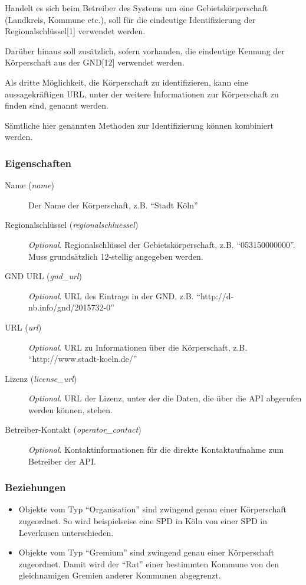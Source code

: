 \documentclass[,a4paper]{article}
\begin{document}
Handelt es sich beim Betreiber des Systems um eine Gebietskörperschaft
(Landkreis, Kommune etc.), soll für die eindeutige Identifizierung der
Regionalschlüssel{[}1{]} verwendet werden.

Darüber hinaus soll zusätzlich, sofern vorhanden, die eindeutige Kennung
der Körperschaft aus der GND{[}12{]} verwendet werden.

Als dritte Möglichkeit, die Körperschaft zu identifizieren, kann eine
aussagekräftigen URL, unter der weitere Informationen zur Körperschaft
zu finden sind, genannt werden.

Sämtliche hier genannten Methoden zur Identifizierung können kombiniert
werden.

\subsubsection{Eigenschaften}

\begin{description}
\item[Name (\emph{name})]
Der Name der Körperschaft, z.B. ``Stadt Köln''
\item[Regionalschlüssel (\emph{regionalschluessel})]
\emph{Optional}. Regionalschlüssel der Gebietskörperschaft, z.B.
``053150000000''. Muss grundsätzlich 12-stellig angegeben werden.
\item[GND URL (\emph{gnd\_url})]
\emph{Optional}. URL des Eintrags in der GND, z.B.
``http://d-nb.info/gnd/2015732-0''
\item[URL (\emph{url})]
\emph{Optional}. URL zu Informationen über die Körperschaft, z.B.
``http://www.stadt-koeln.de/''
\item[Lizenz (\emph{license\_url})]
\emph{Optional}. URL der Lizenz, unter der die Daten, die über die API
abgerufen werden können, stehen.
\item[Betreiber-Kontakt (\emph{operator\_contact})]
\emph{Optional}. Kontaktinformationen für die direkte Kontaktaufnahme
zum Betreiber der API.
\end{description}

\subsubsection{Beziehungen}

\begin{itemize}
\item
  Objekte vom Typ ``Organisation'' sind zwingend genau einer
  Körperschaft zugeordnet. So wird beispielseise eine SPD in Köln von
  einer SPD in Leverkusen unterschieden.
\item
  Objekte vom Typ ``Gremium'' sind zwingend genau einer Körperschaft
  zugeordnet. Damit wird der ``Rat'' einer bestimmten Kommune von den
  gleichnamigen Gremien anderer Kommunen abgegrenzt.
\end{itemize}
\end{document}
